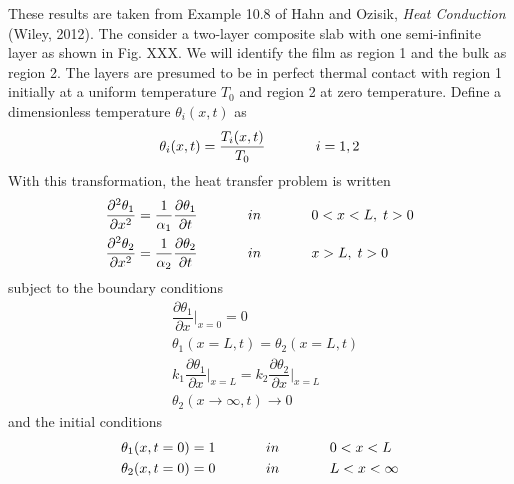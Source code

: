 \documentclass[letterpaper,11pt]{article}
\begin{document}
These results are taken from Example 10.8 of Hahn and Ozisik, \emph{Heat Conduction} (Wiley, 2012).  The consider a two-layer composite slab with one semi-infinite layer as shown in Fig. XXX.   We will identify the film as region 1 and the bulk as region 2.   
The layers are presumed to be in perfect thermal contact with region 1 initially at a uniform temperature $T_0$ and region 2 at zero temperature.  Define a dimensionless temperature $\theta_i(x,t)$ as
\begin{equation}
\theta_i(x,t) = \dfrac{T_i(x,t)}{T_0} \hspace{0.5in} i = 1,2
\end{equation}
With this transformation, the heat transfer problem is written
\begin{subequations}
\begin{align}
\dfrac{\partial^2 \theta_1}{\partial x^2} &= \dfrac{1}{\alpha_1}\dfrac{\partial \theta_1}{\partial t} \hspace{0.5in} in \hspace{0.5in} 0<x<L, \; t>0 \\
\dfrac{\partial^2 \theta_2}{\partial x^2} &= \dfrac{1}{\alpha_2}\dfrac{\partial \theta_2}{\partial t} \hspace{0.5in} in \hspace{0.5in} x>L,\; t>0
\end{align}
\end{subequations}
subject to the boundary conditions
\begin{subequations}
\begin{align}
& \dfrac{\partial \theta_1}{\partial x} \Big| _{x=0} = 0 \\
& \theta_1(x=L,t) = \theta_2(x=L,t) \\
& k_1 \dfrac{\partial\theta_1}{\partial x} \Big| _{x=L} = k_2  \dfrac{\partial\theta_2}{\partial x} \Big| _{x=L} \\
& \theta_2(x \rightarrow \infty,t) \rightarrow 0
\end{align}
\end{subequations}
and the initial conditions
\begin{subequations}
\begin{align}
& \theta_1(x, t=0) = 1 \hspace{0.5in} in \hspace{0.5in} 0<x<L \\
& \theta_2(x, t=0) = 0 \hspace{0.5in} in \hspace{0.5in} L<x<\infty
\end{align}
\end{subequations}
\end{document}
